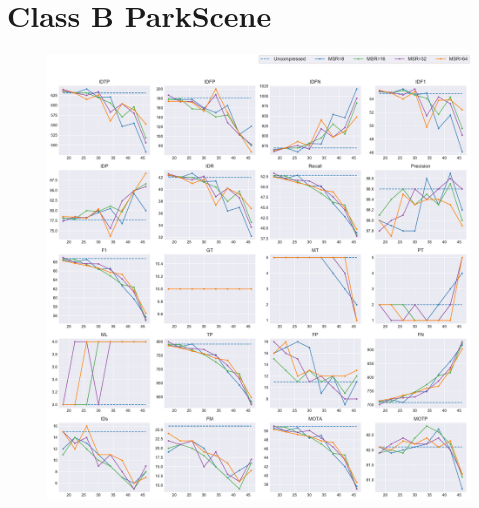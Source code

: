 
\section{Class B ParkScene}
\label{sec:appendix/ParkScene_all}


\begin{figure}[!htbp]
\centering
\includegraphics[width=1.0\linewidth]{img/appendix/ParkScene_all_multiplots_qp.pdf}
\caption[Result of all object classes in Class B ParkScene with Horizontal Axis of QP]{}
\label{fig:ParkScene_all_qp}
\end{figure}

